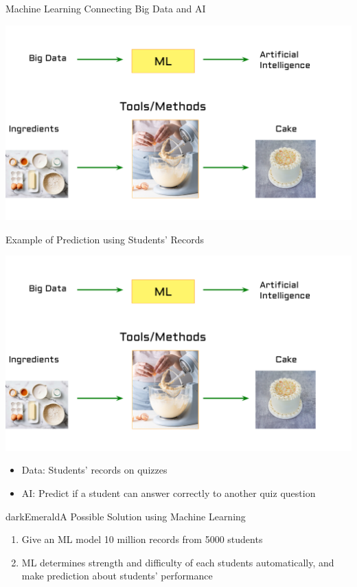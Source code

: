 \documentclass[aspectratio=169,xcolor=dvipsnames,svgnames,x11names,fleqn]{beamer}
\begin{document}
\begin{frame}{Machine Learning Connecting Big Data and AI}
    \begin{center}
      \includegraphics[height=.7\textheight]{figures/CakeData.pdf}
\end{center}
\end{frame}

\begin{frame}{Example of Prediction using Students' Records}
    \begin{center}
      \includegraphics[width=0.7\linewidth,trim=0cm 10cm 0cm 0cm,clip]{figures/CakeData.pdf}
\end{center}
\begin{itemize}
    \item Data: Students’ records on quizzes
    \item AI: Predict if a student can answer correctly to another quiz question
\end{itemize}

 \begin{msgbox}{darkEmerald}{A Possible Solution using Machine Learning}
        \begin{enumerate}
            \item Give an ML model 10 million records from 5000 students
            \item ML determines strength and difficulty  of each students automatically, and make prediction about students' performance
        \end{enumerate}
    \end{msgbox}
    
\end{frame}
\end{document}
